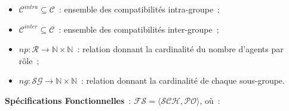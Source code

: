 \documentclass[francais,ROIA,Unicode,manuscript]{cedram}
\begin{document}
\begin{itemize}
\begin{itemize}
              \item $\mathcal{C}^{intra} \subseteq \mathcal{C}$~: ensemble des compatibilités intra-groupe~;
              \item $\mathcal{C}^{inter} \subseteq \mathcal{C}$~: ensemble des compatibilités inter-groupe~;
              \item $np: \mathcal{R} \rightarrow \mathbb{N} \times \mathbb{N}$~: relation donnant la cardinalité du nombre d'agents par rôle~;
              \item $ng: \mathcal{SG} \rightarrow \mathbb{N} \times \mathbb{N}$~: relation donnant la cardinalité de chaque sous-groupe.
          \end{itemize}
\end{itemize}

\medskip

\noindent \textbf{Spécifications Fonctionnelles}~: \quad $\mathcal{FS} = \langle \mathcal{SCH}, \mathcal{PO} \rangle$, où~:
\end{document}
